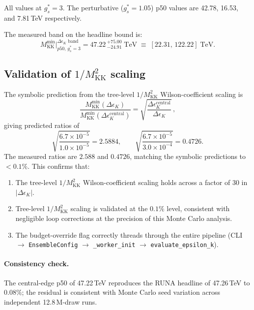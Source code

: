 \documentclass[11pt]{article}
\newcommand{\Mkk}{M_{\mathrm{KK}}}
\newcommand{\gs}{g_s^*}
\newcommand{\eK}{\epsilon_K}
\newcommand{\DeK}{\Delta\eK}
\begin{document}
All values at $\gs = 3$.  The perturbative ($\gs = 1.05$) p50
values are 42.78, 16.53, and 7.81\,TeV respectively.

The measured band on the headline bound is:
\begin{equation}\label{eq:band}
  \Mkk^{\min}\big|_{p50,\,\gs=3}^{\DeK\text{ band}}
  = 47.22\,^{+75.00}_{-24.91}\;\mathrm{TeV}
  \;\equiv\;
  [22.31,\, 122.22]\;\mathrm{TeV}.
\end{equation}

\subsection{Validation of $1/\Mkk^2$ scaling}
\label{sec:scaling}

The symbolic prediction from the tree-level $1/\Mkk^2$
Wilson-coefficient scaling is
\begin{equation}\label{eq:symbolic}
  \frac{\Mkk^{\min}(\DeK)}{\Mkk^{\min}(\DeK^{\mathrm{central}})}
  = \sqrt{\frac{\DeK^{\mathrm{central}}}{\DeK}}\,,
\end{equation}
giving predicted ratios of
\[
  \sqrt{\frac{6.7\times10^{-5}}{1.0\times10^{-5}}} = 2.5884,\qquad
  \sqrt{\frac{6.7\times10^{-5}}{3.0\times10^{-4}}} = 0.4726.
\]
The measured ratios are $2.588$ and $0.4726$, matching the symbolic
predictions to $< 0.1\%$.  This confirms that:
\begin{enumerate}[nosep]
  \item The tree-level $1/\Mkk^2$ Wilson-coefficient scaling holds
    across a factor of 30 in $|\DeK|$.
  \item Tree-level $1/\Mkk^2$ scaling is validated at the $0.1\%$
    level, consistent with negligible loop corrections at the
    precision of this Monte Carlo analysis.
  \item The budget-override flag correctly threads through the entire
    pipeline (CLI $\to$ \texttt{EnsembleConfig} $\to$
    \texttt{\_worker\_init} $\to$ \texttt{evaluate\_epsilon\_k}).
\end{enumerate}

\paragraph{Consistency check.}
The central-edge p50 of 47.22\,TeV reproduces the RUNA headline of
47.26\,TeV to $0.08\%$; the residual is consistent with Monte Carlo
seed variation across independent 12.8\,M-draw runs.
\end{document}
